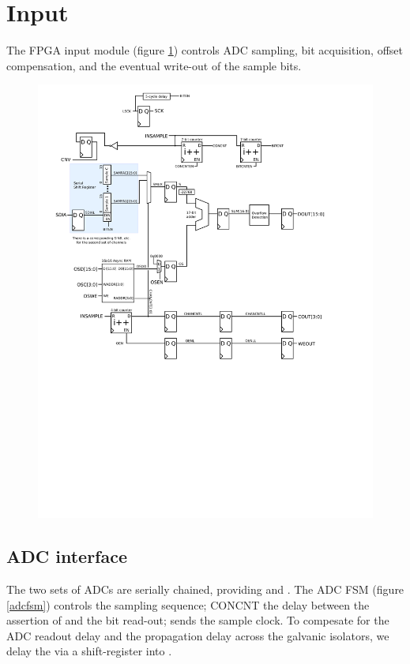 \section{Input}

The FPGA input module (figure \ref{input}) controls ADC sampling, bit acquisition, offset compensation, and the eventual write-out of the sample bits. 

\begin{figure}[h!]
\begin{centering}
\label{input}
\includegraphics[width=5in]{input.svg}
\end{centering}
\end{figure}


\subsection{ADC interface}
The two sets of ADCs are serially chained, providing  and . The ADC FSM (figure \ref{adcfsm}) controls the sampling sequence; CONCNT the delay between the assertion of  and the bit read-out;  sends the sample clock. To compesate for the ADC readout delay and the propagation delay across the galvanic isolators, we delay the  via a shift-register into . 

